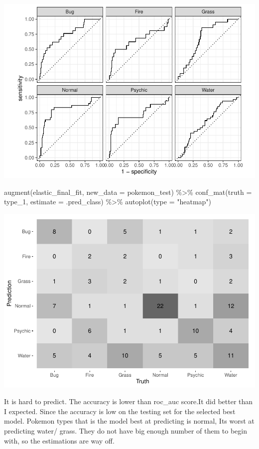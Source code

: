 \documentclass[
]{article}
\newenvironment{Shaded}{\begin{snugshade}}{\end{snugshade}}
\newcommand{\AttributeTok}[1]{\textcolor[rgb]{0.77,0.63,0.00}{#1}}
\newcommand{\FunctionTok}[1]{\textcolor[rgb]{0.00,0.00,0.00}{#1}}
\newcommand{\NormalTok}[1]{#1}
\newcommand{\SpecialCharTok}[1]{\textcolor[rgb]{0.00,0.00,0.00}{#1}}
\newcommand{\StringTok}[1]{\textcolor[rgb]{0.31,0.60,0.02}{#1}}
\begin{document}
\includegraphics{PSTAT131HW05_files/figure-latex/unnamed-chunk-16-1.pdf}

\begin{Shaded}
\begin{Highlighting}[]
\FunctionTok{augment}\NormalTok{(elastic\_final\_fit, }\AttributeTok{new\_data =}\NormalTok{ pokemon\_test) }\SpecialCharTok{\%\textgreater{}\%}
  \FunctionTok{conf\_mat}\NormalTok{(}\AttributeTok{truth =}\NormalTok{ type\_1, }\AttributeTok{estimate =}\NormalTok{ .pred\_class) }\SpecialCharTok{\%\textgreater{}\%} 
  \FunctionTok{autoplot}\NormalTok{(}\AttributeTok{type =} \StringTok{"heatmap"}\NormalTok{)}
\end{Highlighting}
\end{Shaded}

\includegraphics{PSTAT131HW05_files/figure-latex/unnamed-chunk-17-1.pdf}

It is hard to predict. The accuracy is lower than roc\_auc score.It did
better than I expected. Since the accuracy is low on the testing set for
the selected best model. Pokemon types that is the model best at
predicting is normal, Its worst at predicting water/ grass. They do not
have big enough number of them to begin with, so the estimations are way
off.
\end{document}
